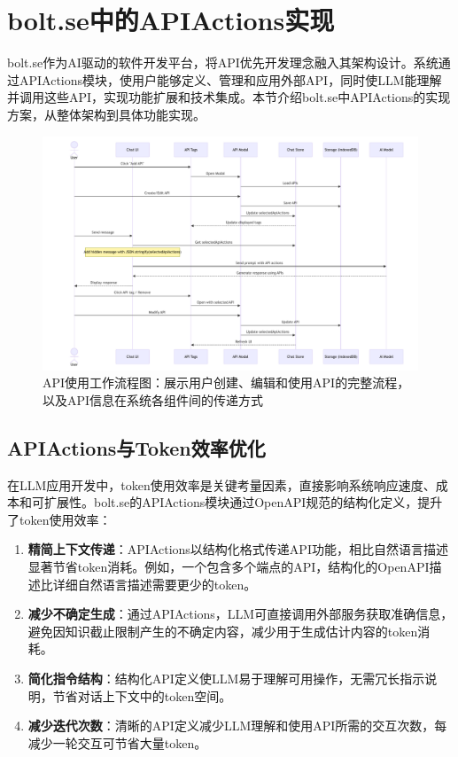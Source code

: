 \section{bolt.se中的APIActions实现}
bolt.se作为AI驱动的软件开发平台，将API优先开发理念融入其架构设计。系统通过APIActions模块，使用户能够定义、管理和应用外部API，同时使LLM能理解并调用这些API，实现功能扩展和技术集成。本节介绍bolt.se中APIActions的实现方案，从整体架构到具体功能实现。

\begin{figure}[htbp]
  \centering
  \includegraphics[width=\textwidth]{figures/api_workflow.pdf}
  \caption{API使用工作流程图：展示用户创建、编辑和使用API的完整流程，以及API信息在系统各组件间的传递方式}
  \label{fig:api_workflow}
\end{figure}

\subsection{APIActions与Token效率优化}
在LLM应用开发中，token使用效率是关键考量因素，直接影响系统响应速度、成本和可扩展性。bolt.se的APIActions模块通过OpenAPI规范的结构化定义，提升了token使用效率：

\begin{enumerate}
  \item \textbf{精简上下文传递}：APIActions以结构化格式传递API功能，相比自然语言描述显著节省token消耗。例如，一个包含多个端点的API，结构化的OpenAPI描述比详细自然语言描述需要更少的token。
  
  \item \textbf{减少不确定生成}：通过APIActions，LLM可直接调用外部服务获取准确信息，避免因知识截止限制产生的不确定内容，减少用于生成估计内容的token消耗。
  
  \item \textbf{简化指令结构}：结构化API定义使LLM易于理解可用操作，无需冗长指示说明，节省对话上下文中的token空间。
  
  \item \textbf{减少迭代次数}：清晰的API定义减少LLM理解和使用API所需的交互次数，每减少一轮交互可节省大量token。
\end{enumerate}

